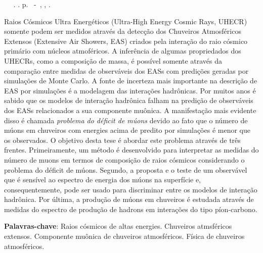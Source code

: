 \setlength{\absparsep}{18pt} %
\begin{resumo}[Resumo]
	\begin{flushleft} 
		        \setlength{\absparsep}{0pt} %
			\SingleSpacing 
			\imprimirautorabr~ ~\textbf{\imprimirtitleabstract}. \imprimirdata. \pageref{LastPage}p. 
			\imprimirtipotrabalhopt~-~\imprimirinstituicao, \imprimirlocal, \imprimirdata. 
 	\end{flushleft}
        \OnehalfSpacing 			

Raios C\'osmicos Ultra Energ\'eticos (Ultra-High Energy Cosmic Rays, UHECR) somente
podem ser medidos atrav\'es da detec\c{c}\~ao dos Chuveiros Atmosf\'ericos Extensos
(Extensive Air Showers, EAS) criados pela intera\c{c}\~ao do raio c\'osmico prim\'ario com
n\'ucleos atmof\'ericos. A infer\^encia de algumas propriedados dos UHECRs, como a composi\c{c}\~ao
de massa, \'e poss\'ivel somente atrav\'es da compara\c{c}\~ao entre medidas de observ\'aveis dos EASs
com predi\c{c}\~oes geradas por simula\c{c}\~oes de Monte Carlo. A fonte de incerteza mais importante
na descri\c{c}\~ao de EAS por simula\c{c}\~oes \'e a modelagem das intera\c{c}\~oes hadr\^onicas. Por muitos
anos \'e sabido que os modelos de intera\c{c}\~ao hadr\^onica falham na predi\c{c}\~ao de observ\'aveis
dos EASs relacionados a sua componente mu\^onica. A manifesta\c{c}\~ao mais evidente disso \'e 
chamada \emph{problema do d\'eficit de m\'uons} devido ao fato que o n\'umero de m\'uons em chuveiros
com energies acima de  predito por simula\c{c}\~oes \'e menor que os observados.
O objetivo desta tese \'e abordar este problema atrav\'es de tr\^es frentes. Primeiramente,
um m\'etodo \'e desenvolvido para interpretar as medidas do n\'umero de muons em termos
de composi\c{c}\~ao de raios c\'osmicos considerando o problema do d\'eficit de m\'uons.
Segundo, a proposta e o teste de um observ\'avel que \'e sens\'ivel ao espectro de energia dos m\'uons
na superf\'icie e, consequentemente, pode ser usado para discriminar entre
os modelos de intera\c{c}\~ao hadr\^onica.
Por \'ultima, a produ\c{c}\~ao de m\'uons em chuveiros \'e estudada atrav\'es
de medidas do espectro de produ\c{c}\~ao de hadrons em intera\c{c}\~oes do tipo p\'ion-carbono.



 \textbf{Palavras-chave}: Raios c\'osmicos de altas energies. Chuveiros atmsf\'ericos extensos. Componente mu\^onica de chuveiros atmosf\'ericos. F\'isica de chuveiros atmosf\'ericos.   
\end{resumo}
